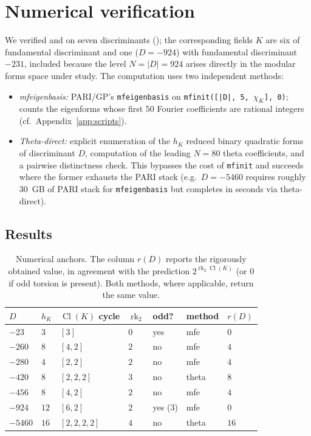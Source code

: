 \documentclass[11pt]{amsart}
\theoremstyle{definition}
\theoremstyle{remark}
\DeclareMathOperator{\Cl}{Cl}
\DeclareMathOperator{\rk}{rk}
\newcommand{\chiK}{\chi_K}
\begin{document}
\section{Numerical verification}\label{sec:numerical}

We verified  and  on seven discriminants
(); the corresponding fields \(K\) are six of
fundamental discriminant and one (\(D = -924\)) with fundamental
discriminant \(-231\), included because the level \(N = |D| = 924\)
arises directly in the modular forms space under study. The
computation uses two independent methods:
\begin{itemize}
  \item \emph{mfeigenbasis:} PARI/GP's \texttt{mfeigenbasis} on
    \texttt{mfinit([|D|, 5, $\chiK$], 0)}; counts the eigenforms whose
    first \(50\) Fourier coefficients are rational integers
    (cf.\ Appendix~\ref{app:scripts}).
  \item \emph{Theta-direct:} explicit enumeration of the \(h_K\)
    reduced binary quadratic forms of discriminant \(D\), computation
    of the leading \(N=80\) theta coefficients, and a pairwise
    distinctness check. This bypasses the cost of \texttt{mfinit} and
    succeeds where the former exhausts the PARI stack
    (e.g.\ \(D=-5460\) requires roughly 30~GB of PARI stack for
    \texttt{mfeigenbasis} but completes in seconds via theta-direct).
\end{itemize}

\subsection{Results}\label{sec:results-table}

\begin{table}[h]
\centering
\caption{Numerical anchors. The column \(r(D)\) reports the rigorously
obtained value, in agreement with the prediction
\(2^{\rk_2 \Cl(K)}\) (or \(0\) if odd torsion is present).
Both methods, where applicable, return the same value.}
\label{tab:anchors}
\begin{tabular}{lllllll}
\toprule
\(D\) & \(h_K\) & \(\Cl(K)\) cycle & \(\rk_2\) & odd? & method & \(r(D)\) \\
\midrule
\(-23\)    & \(3\)  & \([3]\)         & \(0\) & yes        & mfe   & \(0\)  \\
\(-260\)   & \(8\)  & \([4,2]\)       & \(2\) & no         & mfe   & \(4\)  \\
\(-280\)   & \(4\)  & \([2,2]\)       & \(2\) & no         & mfe   & \(4\) \\
\(-420\)   & \(8\)  & \([2,2,2]\)     & \(3\) & no         & theta & \(8\)  \\
\(-456\)   & \(8\)  & \([4,2]\)       & \(2\) & no         & mfe   & \(4\) \\
\(-924\)   & \(12\) & \([6,2]\)       & \(2\) & yes (\(3\))& mfe   & \(0\)  \\
\(-5460\)  & \(16\) & \([2,2,2,2]\)   & \(4\) & no         & theta & \(16\) \\
\bottomrule
\end{tabular}
\end{table}
\end{document}
